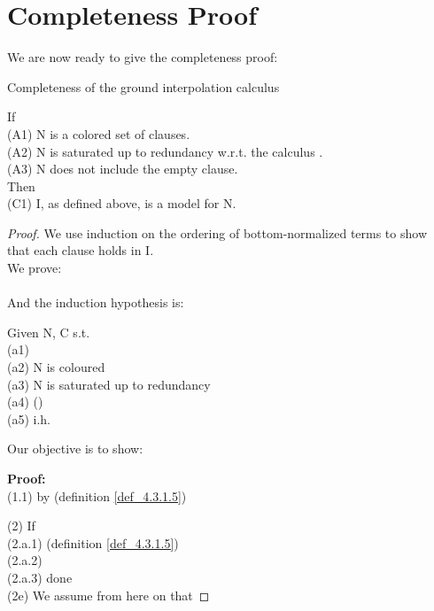 \noindent
\section*{Completeness Proof}
We are now ready to give the completeness proof:

\begin{theorem}{Completeness of the ground interpolation calculus}


\noindent
If\\
(A1) N is a colored set of clauses.\\
(A2) N is saturated up to redundancy w.r.t. the calculus .\\
(A3) N does not include the empty clause.\\
Then\\
(C1) I, as defined above, is a model for N.
	

\begin{proof}
	We use induction on the ordering of bottom-normalized terms to show that each clause holds in I.\\ 
	We prove:\\
	\\
	And the induction hypothesis is:\\
	
\bigskip
	
	\noindent
	Given N, C s.t.\\
	(a1) \\
	(a2) N is coloured\\
	(a3) N is saturated up to redundancy\\
	(a4)  ()\\
	(a5) i.h. 
	
	\noindent
	Our objective is to show:\\
	
	\bigskip
	
	\noindent
	\textbf{Proof:}\\
	(1.1)  by (definition \ref{def_4.3.1.5})

	\bigskip

	\noindent
	(2) If \\
	\indent (2.a.1)  (definition \ref{def_4.3.1.5})\\
	\indent (2.a.2) \\
	\indent (2.a.3) done\\
	(2e) We assume from here on that 
	

\end{proof}
\end{theorem}
